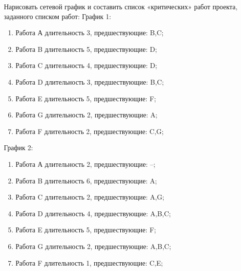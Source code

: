 \question
Нарисовать сетевой график и составить список «критических»
работ проекта, заданного списком работ:
График 1:
\begin{enumerate}
\item  Работа А длительность 3, предшествующие: B,C;
\item  Работа B длительность 5, предшествующие: D;
\item  Работа C длительность 4, предшествующие: D;
\item  Работа D длительность 3, предшествующие: B,C;
\item  Работа E длительность 5, предшествующие: F;
\item  Работа G длительность 2, предшествующие: A;
\item  Работа F длительность 2, предшествующие: C,G;
\end{enumerate}
График 2:
\begin{enumerate}
\item  Работа А длительность 2, предшествующие: --;
\item  Работа B длительность 6, предшествующие: A;
\item  Работа C длительность 2, предшествующие: A,G;
\item  Работа D длительность 4, предшествующие: A,B,C;
\item  Работа E длительность 5, предшествующие: F;
\item  Работа G длительность 2, предшествующие: A,B,C;
\item  Работа F длительность 1, предшествующие: C,E;
\end{enumerate}